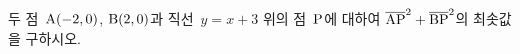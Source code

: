 두 점~$\mathrm{A}(-2{,}\mkern3mu\mathopen{}0)$, $\mathrm{B}(2{,}\mkern3mu\mathopen{}0)$과 직선~$y=x+3$ 위의 점~$\mathrm{P}$에 대하여 $\overline{\mathrm{AP}}^2+\overline{\mathrm{BP}}^2$의 최솟값을 구하시오.
